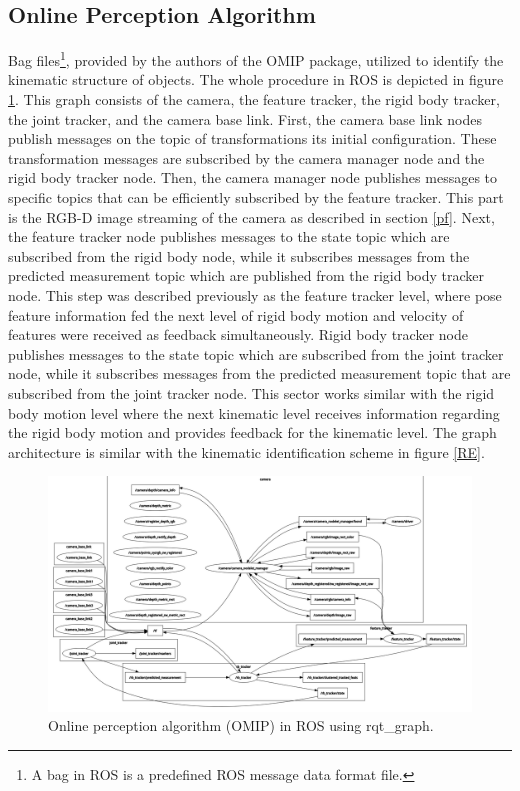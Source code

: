\documentclass[letterpaper, 10 pt, conference]{ieeeconf}
\begin{document}
\subsection{Online Perception Algorithm}\label{ORP}
Bag files\footnote{A bag in ROS is a predefined ROS message data format file.}, provided by the authors of the OMIP package, utilized to identify the kinematic structure of objects. The whole procedure in ROS is depicted in figure \ref{rqt}. This graph consists of the camera, the feature tracker, the rigid body tracker, the joint tracker, and the camera base link. First, the camera base link nodes publish messages on the topic of transformations its initial configuration. These transformation messages are subscribed by the camera manager node and the rigid body tracker node. Then, the camera manager node publishes messages to specific topics that can be efficiently subscribed by the feature tracker. This part is the RGB-D image streaming of the camera as described in section \ref{pf}. Next, the feature tracker node publishes messages to the state topic which are subscribed from the rigid body node, while it subscribes messages from the predicted measurement topic which are published from the rigid body tracker node. This step was described previously as the feature tracker level, where pose feature information fed the next level of rigid body motion and velocity of features were received as feedback simultaneously. Rigid body tracker node publishes messages to the state topic which are subscribed from the joint tracker node, while it subscribes messages from the predicted measurement topic that are subscribed from the joint tracker node. This sector works similar with the rigid body motion level where the next kinematic level receives information regarding the rigid body motion and provides feedback for the kinematic level. The graph architecture is similar with the kinematic identification scheme in figure \ref{RE}. 


\begin{figure}[!h]
        \includegraphics[width=.555\textwidth]{figures/rqt_graph.png}
        \centering
        \caption{Online perception algorithm (OMIP) in ROS using rqt\_graph.}
        \label{rqt}
\end{figure}
\end{document}
